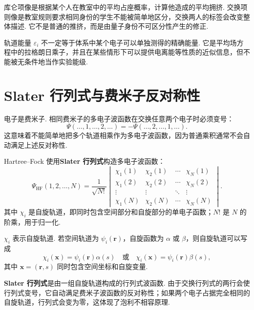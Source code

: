 \documentclass[UTF8,11pt,a4paper,openany]{ctexbook}
\newcommand{\term}[1]{\textbf{#1}}
\begin{document}
\begin{analogybox}
库仑项像是根据某个人在教室中的平均占座概率，计算他造成的平均拥挤. 交换项则像是教室规则要求相同身份的学生不能被简单地区分，交换两人的标签会改变整体描述. 它不是普通的推挤，而是由量子身份不可区分性产生的修正. 
\end{analogybox}

\begin{limitbox}
轨道能量 $\varepsilon_i$ 不一定等于体系中某个电子可以单独测得的精确能量. 它是平均场方程中的拉格朗日乘子，并且在某些情形下可以提供电离能等性质的近似信息，但不能被无条件地当作实验能级. 
\end{limitbox}

\section{Slater 行列式与费米子反对称性}

电子是费米子. 相同费米子的多电子波函数在交换任意两个电子时必须变号：
\[
\Psi(\ldots,1,\ldots,2,\ldots)
=
-\Psi(\ldots,2,\ldots,1,\ldots).
\]
这意味着不能简单地把多个轨道相乘作为多电子波函数，因为普通乘积通常不会自动满足上述反对称性. 

Hartree--Fock 使用\term{Slater 行列式}构造多电子波函数：
\[
\Psi_{\mathrm{HF}}(1,2,\ldots,N)
=
\frac{1}{\sqrt{N!}}
\begin{vmatrix}
\chi_1(1)&\chi_2(1)&\cdots&\chi_N(1)\\
\chi_1(2)&\chi_2(2)&\cdots&\chi_N(2)\\
\vdots&\vdots&\ddots&\vdots\\
\chi_1(N)&\chi_2(N)&\cdots&\chi_N(N)
\end{vmatrix}.
\]
其中 $\chi_i$ 是自旋轨道，即同时包含空间部分和自旋部分的单电子函数；$N!$ 是 $N$ 的阶乘，用于归一化. 

\begin{notationbox}
$\chi_i$ 表示自旋轨道. 若空间轨道为 $\psi_i(\mathbf r)$，自旋函数为 $\alpha$ 或 $\beta$，则自旋轨道可以写成
\[
\chi_i(\mathbf x)=\psi_i(\mathbf r)\alpha(s)
\quad\text{或}\quad
\chi_i(\mathbf x)=\psi_i(\mathbf r)\beta(s),
\]
其中 $\mathbf x=(\mathbf r,s)$ 同时包含空间坐标和自旋变量. 
\end{notationbox}

\begin{definitionbox}
\term{Slater 行列式}是由一组自旋轨道构成的行列式波函数. 由于交换行列式的两行会使行列式变号，它自动满足费米子波函数的反对称性；如果两个电子占据完全相同的自旋轨道，行列式会变为零，这体现了泡利不相容原理. 
\end{definitionbox}
\end{document}
